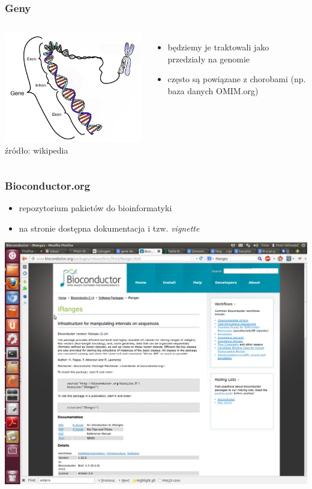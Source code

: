 \documentclass[table]{beamer}
\begin{document}
\begin{frame}\frametitle{Geny}
 \begin{columns}    
	    \begin{center}
	   \includegraphics[width=0.9 \textwidth]{SER-images/Gene.png}\\
	   \tiny{źródło: wikipedia}  
	    \end{center}
\begin{itemize}
\item będziemy je traktowali jako przedziały na genomie
\item często są powiązane z chorobami (np. baza danych OMIM.org)
\end{itemize}
\end{columns}
\end{frame}


\begin{frame}\frametitle{Bioconductor.org}  
\begin{itemize}  
 \item repozytorium pakietów do bioinformatyki
 \item na stronie dostępna dokumentacja i tzw. {\em vignette}
\end{itemize}
\begin{center}
	   \includegraphics[width=0.9 \textwidth]{SER-images/Bioconductor.png}\\	   
	    \end{center}
\end{frame}
\end{document}
